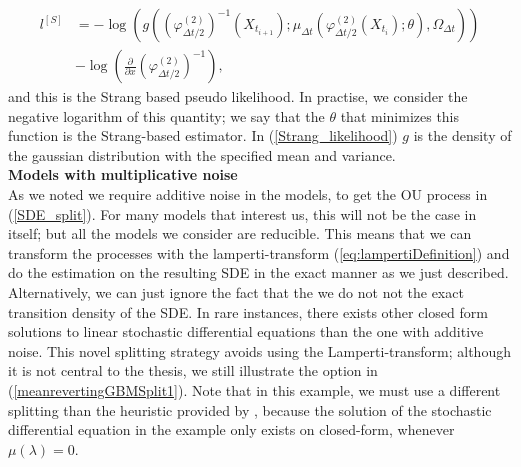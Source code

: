 \begin{align}
    l^{[S]} &= -\log\left(g\left(\left(\varphi_{\Delta t / 2}^{(2)}\right)^{-1}\left(X_{t_{i+1}}\right); \mu_{\Delta t}\left(\varphi_{\Delta t/2}^{(2)}\left(X_{t_{i}}\right); \theta \right), \Omega_{\Delta t} \right) \right) \nonumber \\
    &- \log\left(\frac{\partial}{\partial x}\left(\varphi_{\Delta t / 2}^{(2)}\right)^{-1} \right), \label{Strang_likelihood}
\end{align}
and this is the Strang based pseudo likelihood. In practise, we consider the negative logarithm of this quantity; we say that the $\theta$ that minimizes this function is the Strang-based estimator.
In (\ref{Strang_likelihood}) $g$ is the density of the gaussian distribution with the specified mean and variance. \\
\textbf{Models with multiplicative noise}\\
As we noted we require additive noise in the models, to get the OU process in (\ref{SDE_split}). For many models that interest us, this will not be the case in itself; but all the models we consider are reducible. This means that we can transform the processes with the lamperti-transform (\ref{eq:lampertiDefinition}) and do the estimation on the resulting SDE in the exact manner as we just described.\\
Alternatively, we can just ignore the fact that the we do not not the exact transition density of the SDE. 
 In rare instances, there exists other closed form solutions to linear stochastic differential equations than the one with additive noise. This novel splitting strategy avoids using the Lamperti-transform; although it is not central to the thesis, we still illustrate the option in (\ref{meanrevertingGBMSplit1}). Note that in this example, we must use a different splitting than the heuristic provided by \cite[section 2.3 and 2.5]{SplittingSchemes}, because the solution of the stochastic differential equation in the example only exists on closed-form, whenever $\mu(\lambda) = 0$. 
